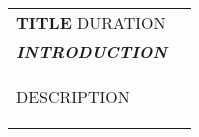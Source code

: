 \begin{tabularx}{\linewidth}{ @{}l r@{} }
\textbf{{{TITLE}}} \hspace*{69ex} {{DURATION}}\\[2pt]
\textbf{\textit{{{INTRODUCTION}}}} \hfill\\[2pt]
\begin{minipage}[t]{\linewidth}
    \begin{itemize}[nosep,after=\strut, leftmargin=2em, itemsep=2pt]
        {{DESCRIPTION}}  
    \end{itemize}
    \end{minipage}
\end{tabularx}